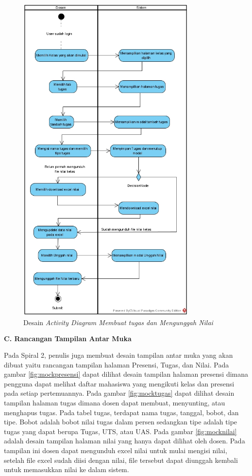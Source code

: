 \begin{figure}[H]
	\centering
	\includegraphics[width=0.8\textwidth]{gambar/diagram/Membuat tugas dan Mengunggah Nilai}
	\caption{Desain \textit{Activity Diagram Membuat tugas dan Mengunggah Nilai}}
	\label{fig:acttugasnilai}
\end{figure}


\textbf{C. Rancangan Tampilan Antar Muka}

	Pada Spiral 2, penulis juga membuat desain tampilan antar muka yang akan dibuat yaitu rancangan tampilan halaman Presensi, Tugas, dan Nilai. Pada gambar \ref{fig:mockpresensi} dapat dilihat desain tampilan halaman presensi dimana pengguna dapat melihat daftar mahasiswa yang mengikuti kelas dan presensi pada setiap pertemuannya. Pada gambar \ref{fig:mocktugas} dapat dilihat desain tampilan halaman tugas dimana dosen dapat membuat, menyunting, atau menghapus tugas. Pada tabel tugas, terdapat nama tugas, tanggal,  bobot, dan tipe. Bobot adalah bobot nilai tugas dalam persen sedangkan tipe adalah tipe tugas yang dapat berupa Tugas, UTS, atau UAS. Pada gambar \ref{fig:mocknilai} adalah desain tampilan halaman nilai yang hanya dapat dilihat oleh dosen. Pada tampilan ini dosen dapat mengunduh excel nilai untuk mulai mengisi nilai, setelah file excel sudah diisi dengan nilai, file tersebut dapat diunggah kembali untuk memasukkan nilai ke dalam sistem.

